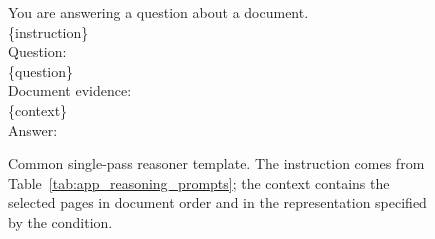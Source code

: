 \begin{figure}[t]
\centering
\begin{tcolorbox}[
  colback=gray!5,
  colframe=gray!50,
  boxrule=0.4pt,
  fontupper=\small\ttfamily,
  left=5pt,right=5pt
]
You are answering a question about a document.\\[0.4em]
\{instruction\}\\[0.4em]
Question:\\
\{question\}\\[0.4em]
Document evidence:\\
\{context\}\\[0.4em]
Answer:
\end{tcolorbox}
\caption{Common single-pass reasoner template. The instruction comes from Table~\ref{tab:app_reasoning_prompts}; the context contains the selected pages in document order and in the representation specified by the condition.}
\label{fig:app_reasoner_template}
\end{figure}